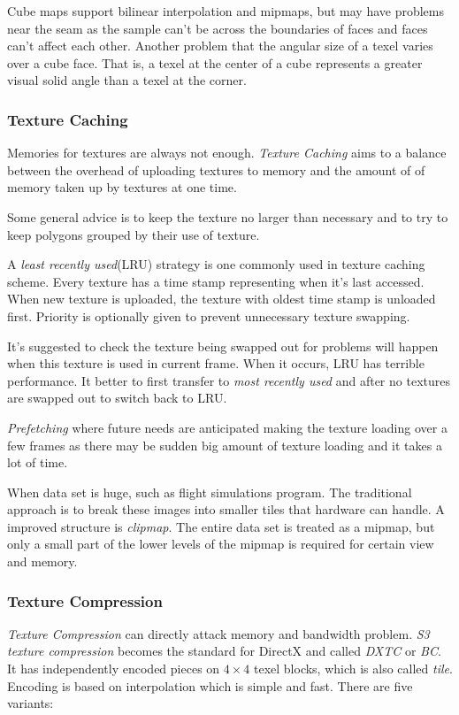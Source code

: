 \documentclass[10pt, a4paper]{article}
\begin{document}
    Cube maps support bilinear interpolation and mipmaps, but may have problems near the seam as the sample can't be across the boundaries of faces and faces can't affect each other. Another problem that the angular size of a texel varies over a cube face.  That is, a texel at the center of a cube represents a greater visual solid angle than a texel at the corner. 

\subsubsection{Texture Caching}
     Memories for textures are always not enough. \emph{Texture Caching} aims to a balance between the overhead of uploading textures to memory and the amount of of memory taken up by textures at one time. 

     Some general advice is to keep the texture no larger than necessary and to try to keep polygons grouped by their use of texture. 

     A \emph{least recently used}(LRU) strategy is one commonly used in texture caching scheme. Every texture has a time stamp representing when it's last accessed. When new texture is uploaded, the texture with oldest time stamp is unloaded first. Priority is optionally given to prevent unnecessary texture swapping. 

     It's suggested to check the texture being swapped out for problems will happen when this texture is used in current frame. When it occurs, LRU has terrible performance. It better to first transfer to \emph{most recently used} and after no textures are swapped out to switch back to LRU. 

     \emph{Prefetching} where future needs are anticipated making the texture loading over a few frames as there may be sudden big amount of texture loading and it takes a lot of time. 

     When data set is huge, such as flight simulations program. The traditional approach is to break these images into smaller tiles that hardware can handle. A improved structure is \emph{clipmap}. The entire data set is treated as a mipmap, but only a small part of the lower levels of the mipmap is required for certain view and memory. 

\subsubsection{Texture Compression}
    \emph{Texture Compression} can directly attack memory and bandwidth problem. \emph{S3 texture compression} becomes the standard for DirectX and called \emph{DXTC} or \emph{BC}. It has independently encoded pieces on $4 \times 4$ texel blocks, which is also called \emph{tile}. Encoding is based on interpolation which is simple and fast. There are five variants: 
    
\end{document}
